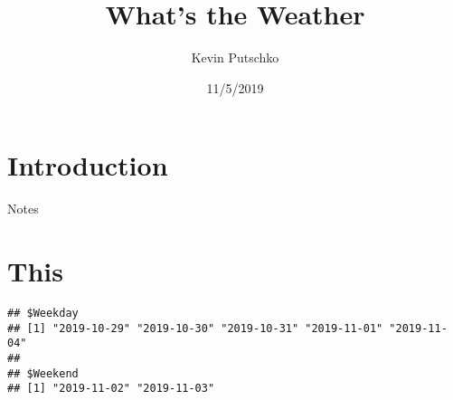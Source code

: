 \documentclass[]{article}
\title{What's the Weather}
\author{Kevin Putschko}
\date{11/5/2019}
\begin{document}
\maketitle

{
\setcounter{tocdepth}{2}
\tableofcontents
}
\newline

\hypertarget{introduction}{%
\section{Introduction}\label{introduction}}

Notes

\newpage

\hypertarget{this}{%
\section{This}\label{this}}

\begin{verbatim}
## $Weekday
## [1] "2019-10-29" "2019-10-30" "2019-10-31" "2019-11-01" "2019-11-04"
## 
## $Weekend
## [1] "2019-11-02" "2019-11-03"
\end{verbatim}
\end{document}
